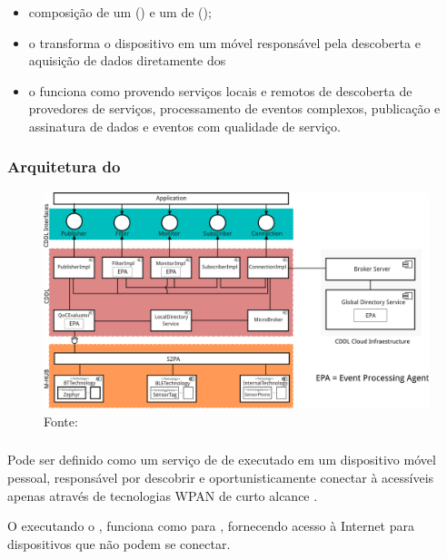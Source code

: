 \documentclass[aspectratio=169]{beamer}
\begin{document}
\begin{frame}
	\frametitle{\mhubcddl}
	\begin{itemize}
		\item composição de um \gateway (\mhub) e um \middleware de \iomt (\cddl);

			\bigskip
			
		\item o \mhub transforma o dispositivo \android em um \gateway \iot móvel responsável pela descoberta e aquisição de dados diretamente dos \smartobjs

			\bigskip
			
		\item o \cddl funciona como \middleware provendo serviços locais e remotos de descoberta de provedores de serviços, processamento de eventos complexos, publicação e assinatura de dados e eventos com qualidade de serviço.
	\end{itemize}
\end{frame}

\begin{frame}
	\frametitle{Arquitetura do \mhubcddl}
	\begin{figure}
		\centering
		\includegraphics[width=.72\linewidth]{img/mhub-cddl-architecture.png}
		\caption{Fonte: \cite{gomes:et-al:2017}}
	\end{figure}
\end{frame}

\begin{frame}
	\frametitle{\mhub}
	Pode ser definido como um serviço de \middleware de \iomt executado em um dispositivo móvel pessoal, responsável por descobrir e oportunisticamente conectar à \smartobjs acessíveis apenas através de tecnologias WPAN de curto alcance \cite{talavera:et-al:2015}.

	\bigskip
	
	O \smartphone executando o \mhub, funciona como \gateway para \smartobjs, fornecendo acesso à Internet para dispositivos que não podem se conectar.
\end{frame}
\end{document}
